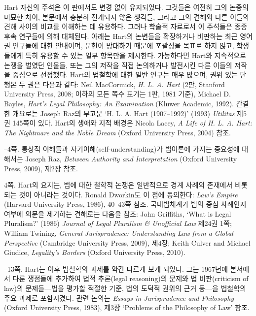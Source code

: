 {Hart 자신의 주석은 이 판에서도 변경 없이 유지되었다. 그것들은 여전히
그의 논증의 미묘한 차이, 본문에서 충분히 전개되지 않은 생각들, 그리고
그의 견해와 다른 이들의 견해 사이의 비교를 이해하는 데 유용하다. 그러나
학술적 자료로서 이 주석들은 종종 후속 연구들에 의해 대체된다. 아래는
Hart의 논변들을 확장하거나 비판하는 최근 영어권 연구들에 대한 안내이며,
문헌이 방대하기 때문에 포괄성을 목표로 하지 않고, 학생들에게 특히 유용할
수 있는 일부 항목만을 제시한다. 가능하다면 Hart와 지속적으로 논쟁을
벌였던 인물들, 또는 그의 저작을 직접 논의하거나 발전시킨 다른 이들의
저작을 중심으로 선정했다. Hart의 법철학에 대한 일반 연구는 매우 많으며,
권위 있는 단행본 두 권은 다음과 같다: Neil MacCormick, \emph{H. L. A.
Hart} (2판, Stanford University Press, 2008; 이하의 모든 쪽수 표기는
1판, 1981 기준), Michael D. Bayles, \emph{Hart's Legal Philosophy: An
Examination} (Kluwer Academic, 1992). 간결한 개요로는 Joseph Raz의
부고문 `H. L. A. Hart (1907--1992)' (1993) \emph{Utilitas} 제5권 145쪽이
있다. Hart의 생애와 지적 배경은 Nicola Lacey, \emph{A Life of H. L. A.
Hart: The Nightmare and the Noble Dream} (Oxford University Press, 2004)
참조.

--4쪽.  통상적 이해들과
자기이해(self-understanding)가 법이론에 가지는 중요성에 대해서는 Joseph
Raz, \emph{Between Authority and Interpretation} (Oxford University
Press, 2009), 제2장 참조.

\noteentry 4쪽.  Hart의 요지는, 법에
대한 철학적 논쟁은 일반적으로 경계 사례의 존재에서 비롯되는 것이
아니라는 것이다. Ronald Dworkin도 이 점에 동의한다: \emph{Law's Empire}
(Harvard University Press, 1986), 40--43쪽 참조. 국내법체계가 법의 중심
사례인지 여부에 의문을 제기하는 견해로는 다음을 참조: John Griffiths,
`What is Legal Pluralism?' (1986) \emph{Journal of Legal Pluralism \&
Unofficial Law} 제24권 1쪽; William Twining, \emph{General
Jurisprudence: Understanding Law from a Global Perspective} (Cambridge
University Press, 2009), 제4장; Keith Culver and Michael Giudice,
\emph{Legality's Borders} (Oxford University Press, 2010).

--13쪽.  Hart는 이후 법철학의
과제를 약간 다르게 보게 되었다. 그는 1967년에 본서에서 다룬 쟁점들에
추가하여 법적 추론(legal reasoning)의 문제와 법 비판(criticism of law)의
문제들---법을 평가할 적절한 기준, 법의 도덕적 권위의 근거 등---을
법철학의 주요 과제로 포함시켰다. 관련 논의는 \emph{Essays in
Jurisprudence and Philosophy} (Oxford University Press, 1983), 제3장
`Problems of the Philosophy of Law' 참조.

}
